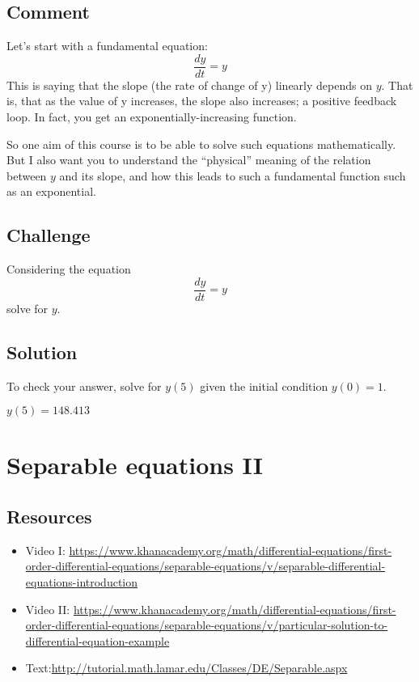 \subsection*{Comment}
Let's start with a fundamental equation:
\begin{equation}
    \frac{dy}{dt} = y
\end{equation}
This is saying that the slope (the rate of change of y) linearly depends on $y$. That is, that as the value of y increases, the slope also increases; a positive feedback loop. In fact, you get an exponentially-increasing function.

So one aim of this course is to be able to solve such equations mathematically. But I also want you to understand the ``physical'' meaning of the relation between $y$ and its slope, and how this leads to such a fundamental function such as an exponential.

\subsection*{Challenge}
Considering the equation
\begin{equation}
    \frac{dy}{dt} = y
\end{equation}
solve for $y$.

\subsection*{Solution}
To check your answer, solve for $y(5)$ given the initial condition $y(0) = 1$.

$y(5) = 148.413$




\newpage
\section{Separable equations II}

\subsection*{Resources}
\begin{itemize}
    \item Video I: \url{https://www.khanacademy.org/math/differential-equations/first-order-differential-equations/separable-equations/v/separable-differential-equations-introduction} 
    \item Video II: \url{https://www.khanacademy.org/math/differential-equations/first-order-differential-equations/separable-equations/v/particular-solution-to-differential-equation-example}
    \item Text:\url{http://tutorial.math.lamar.edu/Classes/DE/Separable.aspx}
\end{itemize}

